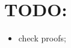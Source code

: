 \documentclass[a4paper, notitlepage, 11pt]{article}
\begin{document}
\section*{TODO:}
\begin{itemize}
 \item check proofs;
\end{itemize}


\end{document}
